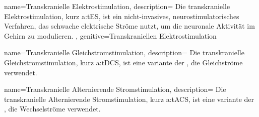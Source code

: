 {
	name=Transkranielle Elektrostimulation,
	description={
			Die transkranielle Elektrostimulation, kurz \acrshort{a:tES}, ist ein nicht-invasives, neurostimulatorisches Verfahren, das schwache elektrische Ströme nutzt, um die neuronale Aktivität im Gehirn zu modulieren.
		},
	genitive=Transkraniellen Elektrostimulation
}


{
	name=Transkranielle Gleichstromstimulation,
	description={
			Die transkranielle Gleichstromstimulation, kurz \acrshort{a:tDCS}, ist eine variante der , die Gleichströme verwendet.
		}
}


{
	name=Transkranielle Alternierende Stromstimulation,
	description={
			Die transkranielle Alternierende Stromstimulation, kurz \acrshort{a:tACS}, ist eine variante der , die Wechselströme verwendet.
		}
}
